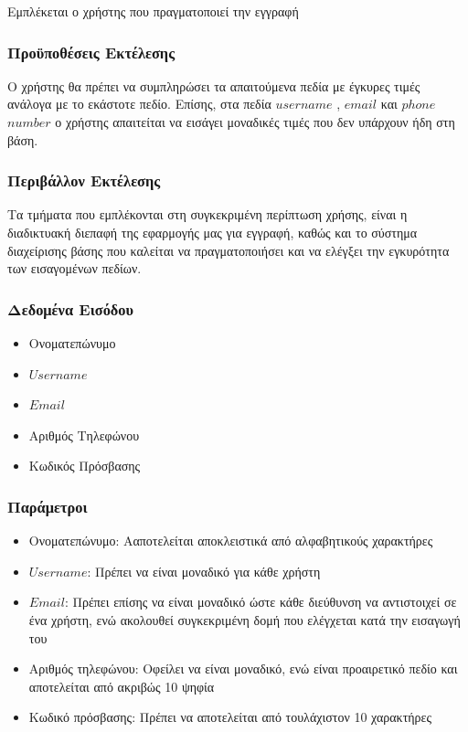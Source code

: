 \documentclass[12pt]{article}
\begin{document}
Εμπλέκεται ο χρήστης που πραγματοποιεί την εγγραφή

\subsubsection{Προϋποθέσεις Εκτέλεσης}

Ο χρήστης θα πρέπει να συμπληρώσει τα απαιτούμενα πεδία με έγκυρες τιμές ανάλογα με το εκάστοτε πεδίο. Επίσης, στα πεδία $username$ , $email$ και $phone$ $number$ ο χρήστης απαιτείται να εισάγει μοναδικές τιμές που δεν υπάρχουν ήδη στη βάση.

\subsubsection{Περιβάλλον Εκτέλεσης}

Τα τμήματα που εμπλέκονται στη συγκεκριμένη περίπτωση χρήσης, είναι η διαδικτυακή διεπαφή της εφαρμογής μας για εγγραφή, καθώς και το σύστημα διαχείρισης βάσης που καλείται να πραγματοποιήσει και να ελέγξει την εγκυρότητα των εισαγομένων πεδίων.

\subsubsection{Δεδομένα Εισόδου}

\begin{itemize}
\item Ονοματεπώνυμο
\item $Username$
\item $Email$
\item Αριθμός Τηλεφώνου
\item Κωδικός Πρόσβασης
\end{itemize} 

\subsubsection{Παράμετροι}

\begin{itemize}
\item Ονοματεπώνυμο: Aαποτελείται αποκλειστικά από αλφαβητικούς χαρακτήρες
\item $Username$: Πρέπει να είναι μοναδικό για κάθε χρήστη
\item $Email$: Πρέπει επίσης να είναι μοναδικό ώστε κάθε διεύθυνση να αντιστοιχεί σε ένα χρήστη, ενώ ακολουθεί συγκεκριμένη δομή που ελέγχεται κατά την εισαγωγή του
\item Αριθμός τηλεφώνου: Οφείλει να είναι μοναδικό, ενώ είναι προαιρετικό πεδίο και αποτελείται από ακριβώς 10 ψηφία
\item Κωδικό  πρόσβασης: Πρέπει να αποτελείται από τουλάχιστον 10 χαρακτήρες
\end{itemize}
\end{document}

